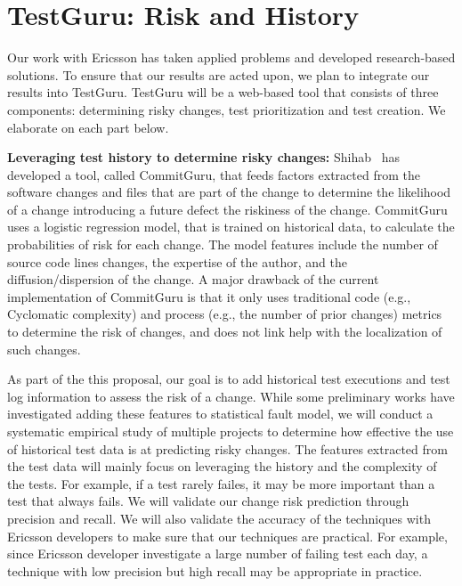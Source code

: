 \section{TestGuru: Risk and History}

Our work with Ericsson has taken applied problems and developed research-based solutions. To ensure that our results are acted upon, we plan to integrate our results into TestGuru. TestGuru will be a web-based tool that consists of three components: determining risky changes, test prioritization and test creation. We elaborate on each part below.

\textbf{Leveraging test history to determine risky changes:} Shihab~\cite{Rosen2015FSE} has developed a tool, called CommitGuru, that feeds factors extracted from the software changes and files that are part of the change to determine the likelihood of a change introducing a future defect \ie the riskiness of the change. CommitGuru uses a logistic regression model, that is trained on historical data, to calculate the probabilities of risk for each change. The model features include the number of source code lines changes, the expertise of the author, and the diffusion/dispersion of the change. A major drawback of the current implementation of CommitGuru is that it only uses traditional code (e.g., Cyclomatic complexity) and process (e.g., the number of prior changes) metrics to determine the risk of changes, and does not link help with the localization of such changes.

As part of the this proposal, our goal is to add historical test executions and test log information to assess the risk of a change. While some preliminary works have investigated adding these features to statistical fault model\cite{herzig,others}, we will conduct a systematic empirical study of multiple projects to determine how effective the use of historical test data is at predicting risky changes. The features extracted from the test data will mainly focus on leveraging the history and the complexity of the tests. For example, if a test rarely failes, it may be more important than a test that always fails. We will validate our change risk prediction through precision and recall. We will also validate the accuracy of the techniques with Ericsson developers to make sure that our techniques are practical. For example, since Ericsson developer investigate a large number of failing test each day, a technique with low precision but high recall may be appropriate in practice.


